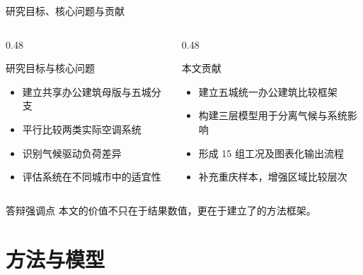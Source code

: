 \documentclass{beamer}
\begin{document}
\begin{frame}{研究目标、核心问题与贡献}
\small
\begin{columns}[T]
    \begin{column}{0.48\textwidth}
        \begin{block}{研究目标与核心问题}
            \begin{itemize}
                \item 建立共享办公建筑母版与五城分支
                \item 平行比较两类实际空调系统
                \item 识别气候驱动负荷差异
                \item 评估系统在不同城市中的适宜性
            \end{itemize}
        \end{block}
    \end{column}
    \begin{column}{0.48\textwidth}
        \begin{block}{本文贡献}
            \begin{itemize}
                \item 建立五城统一办公建筑比较框架
                \item 构建三层模型用于分离气候与系统影响
                \item 形成 15 组工况及图表化输出流程
                \item 补充重庆样本，增强区域比较层次
            \end{itemize}
        \end{block}
    \end{column}
\end{columns}

\vspace{0.3em}
\begin{exampleblock}{答辩强调点}
本文的价值不只在于结果数值，更在于建立了的方法框架。
\end{exampleblock}
\end{frame}

\section{方法与模型}
\end{document}
